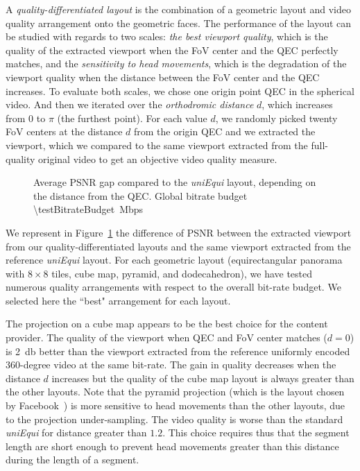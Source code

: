 
A \textit{quality-differentiated layout} is the combination of a geometric layout and video quality
arrangement onto the geometric faces. The performance of the layout can be studied with
regards to two scales: \emph{the best viewport quality}, which is the quality of the extracted viewport
when the FoV center and the QEC perfectly matches, and the \emph{sensitivity to head movements},
which is the degradation of the viewport quality when the distance between the FoV center
and the QEC increases.
To evaluate both scales, we chose one origin point \ac{QEC} in the spherical video. And then we iterated
over the \emph{orthodromic distance} $d$, which increases from $0$ to $\pi$ (the furthest point). For each
value $d$, we randomly picked twenty \ac{FoV} centers at the distance $d$ from the origin \ac{QEC}
and we extracted the viewport, which we compared to the same viewport extracted from the
full-quality original video to get an objective video quality measure.

\begin{figure}
    
    \caption{Average \acs{PSNR} gap compared to the \emph{uniEqui} layout, depending on the distance from the \acs{QEC}. Global bitrate budget \SI{\testBitrateBudget}{\mega bps}}
    \label{fig:dist_quality_psnr}
\end{figure}

We represent in Figure~\ref{fig:dist_quality_psnr} the difference of \ac{PSNR} between
the extracted viewport from our quality-differentiated layouts and the same viewport extracted from
the reference \textit{uniEqui} layout. For each geometric layout (equirectangular
panorama with $8\!\times\! 8$ tiles, cube map, pyramid, and dodecahedron), we have tested
numerous quality arrangements with respect to the overall bit-rate budget. We selected
here the ``best" arrangement for each layout.

The projection on a cube map appears to be the best choice for the content provider. The quality of
the viewport when QEC and FoV center matches ($d=0$) is \SI{2}{\decibel} better than the viewport extracted
from the reference uniformly encoded 360-degree video at the same bit-rate. The gain in quality
decreases when the distance $d$ increases but the quality of the cube map layout is always greater
than the other layouts. Note that the pyramid projection (which is the layout chosen
by Facebook~\cite{facebook}) is more sensitive to head movements than
the other layouts, due to the projection under-sampling. The video quality is worse than
the standard \emph{uniEqui} for distance greater than $1.2$. This choice requires thus
that the segment length are short enough to prevent head movements greater than this
distance during the length of a segment.

